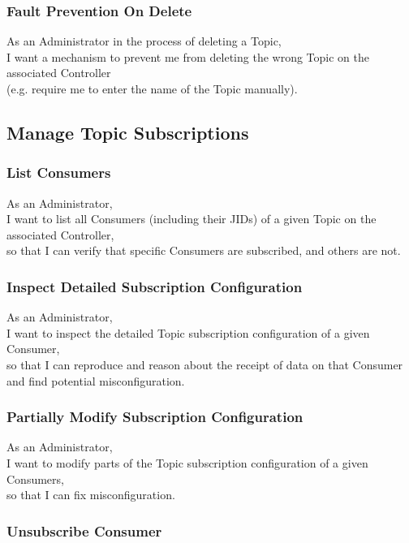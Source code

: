 \subsubsection{Fault Prevention On Delete}

As an Administrator in the process of deleting a Topic, \\
I want a mechanism to prevent me from deleting the wrong Topic on the associated Controller\\
(e.g. require me to enter the name of the Topic manually).

\subsection{Manage Topic Subscriptions}

\subsubsection{List Consumers}

As an Administrator, \\
I want to list all Consumers (including their JIDs) of a given Topic on the associated Controller, \\
so that I can verify that specific Consumers are subscribed, and others are not.

\subsubsection{Inspect Detailed Subscription Configuration}

As an Administrator, \\
I want to inspect the detailed Topic subscription configuration of a given Consumer, \\
so that I can reproduce and reason about the receipt of data on that Consumer
and find potential misconfiguration.

\subsubsection{Partially Modify Subscription Configuration}

As an Administrator, \\
I want to modify parts of the Topic subscription configuration of a given Consumers, \\
so that I can fix misconfiguration.

\subsubsection{Unsubscribe Consumer}


